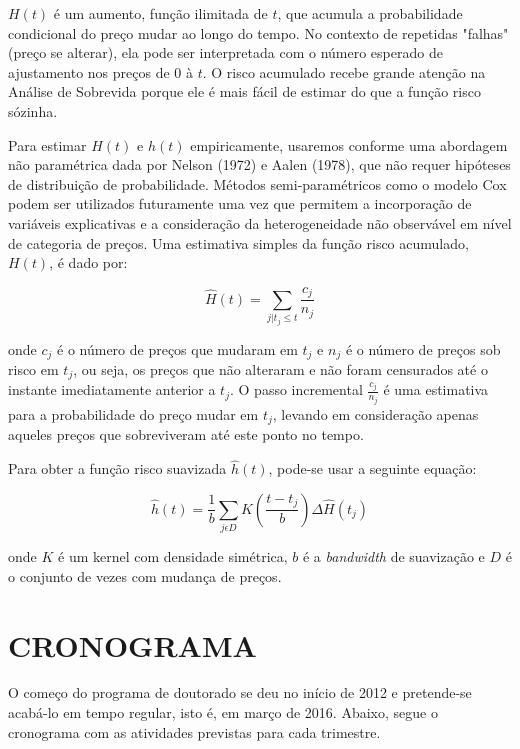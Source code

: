 \documentclass[twoside,a4paper,11pt]{report}
\begin{document}
$H(t)$ é um aumento, função ilimitada de $t$, que acumula a probabilidade condicional do preço mudar ao longo do tempo. No contexto de repetidas "falhas" (preço se alterar), ela pode ser interpretada com o número esperado de ajustamento nos preços de $0$ à $t$. O risco acumulado recebe grande atenção na Análise de Sobrevida porque ele é mais fácil de estimar do que a função risco sózinha. 

Para estimar $H(t)$ e $h(t)$ empiricamente, usaremos conforme \citet{cavallo2010scraped} uma abordagem não paramétrica dada por Nelson (1972) e Aalen (1978), que não requer hipóteses de distribuição de probabilidade. Métodos semi-paramétricos como o modelo Cox podem ser utilizados futuramente uma vez que permitem a incorporação de variáveis explicativas e a consideração da heterogeneidade não observável em nível de categoria de preços. Uma estimativa simples da função risco acumulado, $H(t)$, é dado por:

\begin{equation}
\hat{H}\left(t\right)=\sum_{j|{t}_{j}\le t}{\frac{{c}_{j}}{{n}_{j}}} 
\end{equation}

\noindent onde ${c}_{j}$ é o número de preços que mudaram em ${t}_{j}$ e ${n}_{j}$ é o número de preços sob risco em ${t}_{j}$, ou seja, os preços que não alteraram e não foram censurados até o instante imediatamente anterior a $t_{j}$. O passo incremental $\frac{{c}_{j}}{{n}_{j}}$ é uma estimativa para a probabilidade do preço mudar em ${t}_{j}$, levando em consideração apenas aqueles preços que sobreviveram até este ponto no tempo. 

Para obter a função risco suavizada $\hat{h}\left(t\right)$, pode-se usar a seguinte equação:

\begin{equation}
\hat{h}\left(t \right)=\frac{1}{b}\sum_{j\epsilon D}{K}\left(\frac{t-{t}_{j}}{b}\right)\Delta \hat {H}\left({t}_{j}\right) 
\end{equation}

\noindent onde $K$ é um kernel com densidade simétrica, $b$ é a \emph{bandwidth} de suavização e $D$ é o conjunto de vezes com mudança de preços. 

\section*{CRONOGRAMA}

O começo do programa de doutorado se deu no início de 2012 e pretende-se acabá-lo em tempo regular, isto é, em março de 2016. Abaixo, segue o cronograma com as atividades previstas para cada trimestre.
\end{document}
